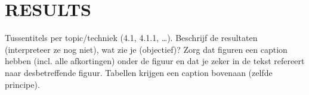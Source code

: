 \section{RESULTS}
Tussentitels per topic/techniek (4.1, 4.1.1, \dots).
Beschrijf de resultaten (interpreteer ze nog niet), wat zie je (objectief)?
Zorg dat figuren een caption hebben (incl. alle afkortingen) onder de figuur en dat je zeker in de tekst refereert naar desbetreffende figuur. 
Tabellen krijgen een caption bovenaan (zelfde principe).
